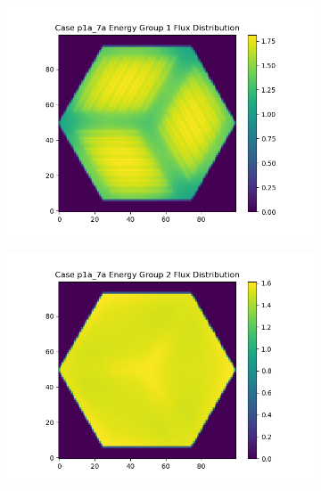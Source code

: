 \documentclass[letterpaper,11pt]{report}
\begin{document}
\begin{figure}[H]
            \begin{subfigure}{.33\textwidth}
              \centering
              \includegraphics[width=1.1\linewidth]{../../phase1a/case7a/analysis_output/p1a_7a_e_eg1.png}
              \caption{}
            \end{subfigure}%
            \begin{subfigure}{.33\textwidth}
              \centering
              \includegraphics[width=1.1\linewidth]{../../phase1a/case7a/analysis_output/p1a_7a_e_eg2.png}
              \caption{}
            \end{subfigure}
            \begin{subfigure}{.33\textwidth}
              \centering

\end{subfigure}
\end{figure}
\end{document}
